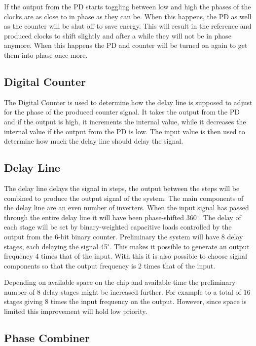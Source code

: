 \documentclass[a4paper,12pt]{article} \usepackage{graphicx}
\newcommand{\degree}{\ensuremath{^\circ}}
\begin{document}
If the output from the PD starts toggling between low and high the phases of the clocks are as close to in phase as they can be. When this happens, the PD as well as the counter will be shut off to save energy. This will result in the reference and produced clocks to shift slightly and after a while they will not be in phase anymore. When this happens the PD and counter will be turned on again to get them into phase once more.

\subsection{Digital Counter}
The Digital Counter is used to determine how the delay line is supposed to adjust for the phase of the produced counter signal. It takes the output from the PD and if the output is high, it increments the internal value, while it decreases the internal value if the output from the PD is low. The input value is then used to determine how much the delay line should delay the signal. 

\subsection{Delay Line}

The delay line delays the signal in steps, the output between the steps will be
combined to produce the output signal of the system. The main components
of the delay line are an even number of inverters.  When the input signal has
passed through the entire delay line it will have been phase-shifted 360\degree. 
The delay of each stage will be set by binary-weighted capacitive loads
controlled by the output from the 6-bit binary counter. Preliminary  the
system will have 8 delay stages, each delaying the signal 45\degree. This makes
it possible to generate an output frequency 4 times that of the input. With this
it is also possible to choose signal components so that the output frequency is
2 times that of the input.

Depending on available space on the chip and available time the preliminary
number of 8 delay stages might be increased further. For example to a total of
16 stages giving 8 times the input frequency on the output. However, since space
is limited this improvement will hold low priority.

\subsection{Phase Combiner}
\end{document}

